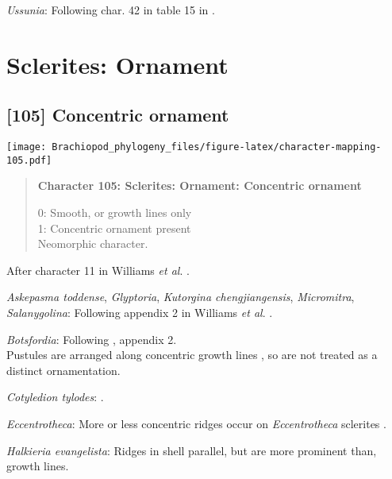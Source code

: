 \documentclass[openany]{book}
\theoremstyle{definition}
\theoremstyle{definition}
\theoremstyle{definition}
\theoremstyle{remark}
\begin{document}
\hypertarget{Ussunia-coding-104}{}
\emph{Ussunia}: Following char. 42 in table 15 in
\citet{Williams2000LinguliformeaCraniiformea}.

\section{Sclerites: Ornament}\label{sclerites-ornament}

\subsection*{{[}105{]} Concentric ornament}\label{concentric-ornament}

\texttt{[image: Brachiopod\_phylogeny\_files/figure-latex/character-mapping-105.pdf]}

\begin{quote}
\textbf{Character 105: Sclerites: Ornament: Concentric ornament}

0: Smooth, or growth lines only\\
1: Concentric ornament present\\
Neomorphic character.
\end{quote}

After character 11 in Williams \emph{et al}.
\citeyearpar{Williams1998Thediversity}.

\hypertarget{Askepasma_toddense-coding-105}{}
\emph{Askepasma toddense}, \emph{Glyptoria}, \emph{Kutorgina
chengjiangensis}, \emph{Micromitra}, \emph{Salanygolina}: Following
appendix 2 in Williams \emph{et al}.
\citeyearpar{Williams1998Thediversity}.

\hypertarget{Botsfordia-coding-105}{}
\emph{Botsfordia}: Following \citet{Williams1998Thediversity}, appendix
2.\\
Pustules are arranged along concentric growth lines
\citep{Skovsted2005EarlyCambrian}, so are not treated as a distinct
ornamentation.

\hypertarget{Cotyledion_tylodes-coding-105}{}
\emph{Cotyledion tylodes}: \citet{Zhang2013}.

\hypertarget{Eccentrotheca-coding-105}{}
\emph{Eccentrotheca}: More or less concentric ridges occur on
\emph{Eccentrotheca} sclerites
\citep{Skovsted2011Scleritomeconstruction}.

\hypertarget{Halkieria_evangelista-coding-105}{}
\emph{Halkieria evangelista}: Ridges in shell parallel, but are more
prominent than, growth lines.
\end{document}
